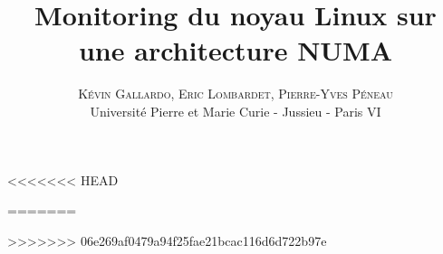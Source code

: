 \documentclass[a4paper]{report}
\title{\vspace{+0cm}\fontsize{24pt}{10pt}\selectfont\textbf{Monitoring du noyau Linux sur une architecture NUMA}}
\author{
\large
\textsc{Kévin Gallardo, Eric Lombardet, Pierre-Yves Péneau}\\[2mm] 
\normalsize Université Pierre et Marie Curie - Jussieu - Paris VI
\vspace{-5mm}
}
\date{}
\begin{document}
  \maketitle
  \newpage

  \tableofcontents
  \newpage

  \setcounter{page}{0}
  \thispagestyle{empty}
  \begin{abstract}
    \centering
    \noindent 
  \end{abstract}
<<<<<<< HEAD

  
  
  


=======
  \newpage
  
  \begin{onehalfspace}
  
  
  
  \end{onehalfspace}
>>>>>>> 06e269af0479a94f25fae21bcac116d6d722b97e
\end{document}
